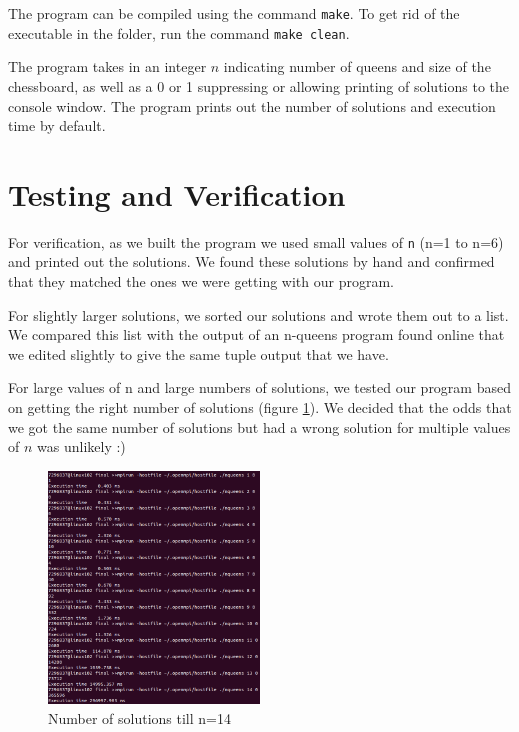 \documentclass{article}
\begin{document}
\medskip
\noindent
The program can be compiled using the command \texttt{make}. To get rid of the 
executable in the folder, run the command \texttt{make clean}.

\medskip
\noindent
The program takes in an integer $n$ indicating number of queens and size of the 
chessboard, as well as a 0 or 1 suppressing or allowing printing of solutions to
the console window. The program prints out the number of solutions and execution
time by default.

\section{Testing and Verification}
For verification, as we built the program we used small values of \texttt{n}
(n=1 to n=6) and printed out the solutions. We found these solutions by hand and
confirmed that they matched the ones we were getting with our program.

\medskip
\noindent
For slightly larger solutions, we sorted our solutions and wrote them out to a 
list. We compared this list with the output of an n-queens program found online 
that we edited slightly to give the same tuple output that we have. 

\medskip
\noindent
For large values of n and large numbers of solutions, we tested our program 
based on getting the right number of solutions (figure \ref{fig:solutions}). We 
decided that the odds that we got the same number of solutions but had a wrong 
solution for multiple values of $n$ was unlikely :) 

\begin{figure}[ht]
	\centering
    \includegraphics[width=0.5\textwidth]{solutions.png} 
    \caption{Number of solutions till n=14}
    \label{fig:solutions}
\end{figure}
\end{document}
